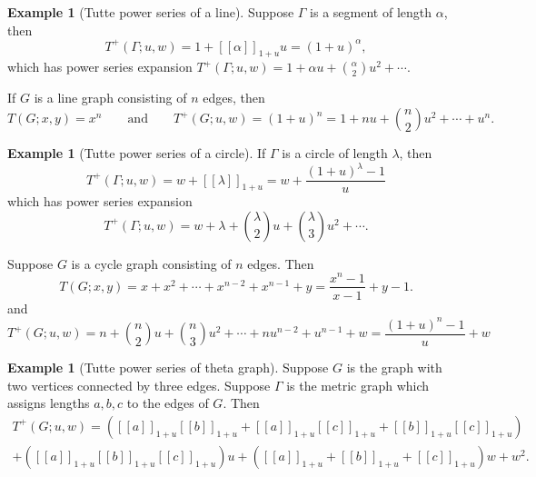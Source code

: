 \documentclass{amsart}
\theoremstyle{definition}
\newtheorem{eg}[thm]{Example}
\newcommand{\fanalog}[2]{[\![#2]\!]_{#1}}
\begin{document}
\begin{eg}[Tutte power series of a line]
Suppose $\Gamma$ is a segment of length $\alpha$,
then
\[
	T^+(\Gamma;u,w) 
	= 1 + \fanalog{1 + u}{\alpha} u
	= (1+u)^\alpha,
\]
which has power series expansion
$
T^+(\Gamma;u,w) 
= 1 + \alpha u + \binom{\alpha}{2}u^2 + \cdots .
$

If $G$ is a line graph consisting of $n$ edges,
then
$$
T(G;x,y) = x^n 
\qquad\text{and}\qquad 
T^+(G;u,w) = (1+u)^n = 1 + nu + \binom{n}{2}u^2 + \cdots + u^n.
$$
\end{eg}

\begin{eg}[Tutte power series of a circle]
If $\Gamma$ is a circle of length $\lambda$, then 
\[
	T^+(\Gamma;u,w) = w + \fanalog{1 + u}{\lambda} = w + \frac{(1 + u)^\lambda - 1}{u}
\]
which has power series expansion
\[
	T^+(\Gamma;u,w) = w + \lambda + \binom{\lambda}{2} u + \binom{\lambda}{3} u^2 + \cdots .
\]

Suppose $G$ is a cycle graph consisting of $n$ edges.
Then
$$
T(G;x,y) = x + x^2 + \cdots + x^{n-2} + x^{n-1} + y 
= \frac{x^n - 1}{x - 1} + y - 1.
$$
and
$$
T^+(G;u,w) = n + \binom{n}{2}u + \binom{n}{3} u^2 + \cdots + nu^{n-2} + u^{n-1} + w
= \frac{(1+u)^n-1}{u} + w
$$
\end{eg}

\begin{eg}[Tutte power series of theta graph]
Suppose $G$ is the graph with two vertices connected by three edges.
Suppose $\Gamma$ is the metric graph which assigns lengths $a,b,c$ to the edges of $G$.
Then
\begin{multline*}
T^+(G;u,w) = ( \fanalog{1 + u}{a} \fanalog{1 + u}{b} + \fanalog{1 + u}{a} \fanalog{1 + u}{c} + \fanalog{1 + u}{b} \fanalog{1 + u}{c} ) \\
+ ( \fanalog{1 + u}{a} \fanalog{1 + u}{b} \fanalog{1 + u}{c} ) u 
+ (\fanalog{1 + u}{a} + \fanalog{1 + u}{b} + \fanalog{1 + u}{c}) w + w^2 .
\end{multline*}

\end{eg}
\end{document}
